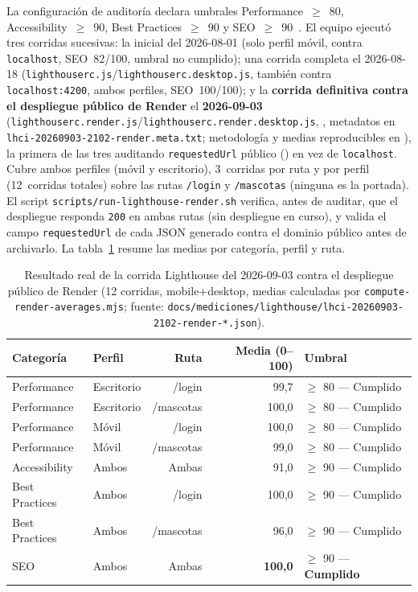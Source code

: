 La configuraci\'on de auditor\'ia declara umbrales Performance~$\geq$~80,
Accessibility~$\geq$~90, Best Practices~$\geq$~90 y SEO~$\geq$~90~\cite{lighthouse-docs}.
El equipo ejecut\'o tres corridas sucesivas: la inicial del 2026-08-01
(solo perfil m\'ovil, contra \texttt{localhost}, SEO~82/100, umbral no
cumplido); una corrida completa el 2026-08-18
(\texttt{lighthouserc.js}\allowbreak/\texttt{lighthouserc.desktop.js}, tambi\'en
contra \texttt{localhost:4200}, ambos perfiles, SEO~100/100); y la
\textbf{corrida definitiva contra el despliegue p\'ublico de Render}
el \textbf{2026-09-03}
(\texttt{lighthouserc.render.js}\allowbreak/\texttt{lighthouserc.render.desktop.js},
,
metadatos en \texttt{lhci-20260903-2102-\allowbreak render.meta.txt}; metodolog\'ia y
medias reproducibles en ),
la primera de las tres auditando \texttt{requestedUrl} p\'ublico
() en vez de \texttt{localhost}.
Cubre ambos perfiles (m\'ovil y escritorio), 3~corridas por ruta y por
perfil (12~corridas totales) sobre las rutas \texttt{/login} y
\texttt{/mascotas} (ninguna es la portada). El script
\texttt{scripts/run-lighthouse-render.sh} verifica, antes de auditar, que
el despliegue responda \texttt{200} en ambas rutas (sin despliegue en
curso), y valida el campo \texttt{requestedUrl} de cada JSON generado
contra el dominio p\'ublico antes de archivarlo. La
tabla~\ref{tab:lighthouse-final} resume las medias por categor\'ia, perfil
y ruta.

\begin{table}[H]
  \centering
  \caption{Resultado real de la corrida Lighthouse del 2026-09-03 contra el despliegue p\'ublico de Render (12 corridas, mobile+desktop, medias calculadas por \texttt{compute-render-averages.mjs}; fuente: \texttt{docs/mediciones/lighthouse/lhci-20260903-2102-render-*.json}).}
  \label{tab:lighthouse-final}
  \begin{tabular}{@{}llrrl@{}}
    \toprule
    Categor\'ia & Perfil & Ruta & Media (0--100) & Umbral \\
    \midrule
    Performance & Escritorio & /login & 99{,}7 & $\geq$ 80 --- Cumplido \\
    Performance & Escritorio & /mascotas & 100{,}0 & $\geq$ 80 --- Cumplido \\
    Performance & M\'ovil & /login & 100{,}0 & $\geq$ 80 --- Cumplido \\
    Performance & M\'ovil & /mascotas & 99{,}0 & $\geq$ 80 --- Cumplido \\
    Accessibility & Ambos & Ambas & 91{,}0 & $\geq$ 90 --- Cumplido \\
    Best Practices & Ambos & /login & 100{,}0 & $\geq$ 90 --- Cumplido \\
    Best Practices & Ambos & /mascotas & 96{,}0 & $\geq$ 90 --- Cumplido \\
    SEO & Ambos & Ambas & \textbf{100{,}0} & $\geq$ 90 --- \textbf{Cumplido} \\
    \bottomrule
  \end{tabular}
\end{table}

